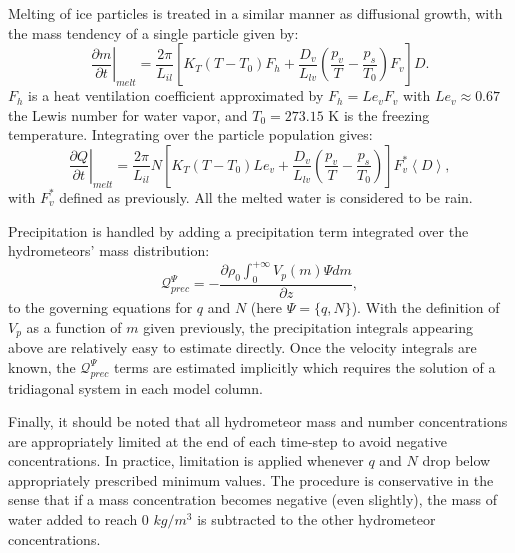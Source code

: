 \documentclass[12pt,A4,french]{article}
\begin{document}
\begin{description}
Melting of ice particles is treated in a similar manner as diffusional growth, with the mass tendency of a single particle given by:
\begin{equation}
\left.\frac{\partial m}{\partial t}\right|_{melt} = \frac{2\pi}{L_{il}} \left[K_{T}\left(T-T_{0}\right)F_{h} + \frac{D_{v}}{L_{lv}}\left(\frac{p_{v}}{T} -
\frac{p_{s}}{T_{0}}\right) F_{v}\right] D.
\end{equation}
$F_{h}$ is a heat ventilation coefficient approximated by $F_{h} = Le_{v} F_{v}$ with $Le_{v} \approx 0.67$ the Lewis number for water vapor, and $T_{0}=273.15$ K is the freezing temperature. Integrating over the particle population gives:
\begin{equation}
\left.\frac{\partial Q}{\partial t}\right|_{melt} = \frac{2\pi}{L_{il}} N \left[K_{T}\left(T-T_{0}\right)Le_{v} + \frac{D_{v}}{L_{lv}}\left(\frac{p_{v}}{T} -
\frac{p_{s}}{T_{0}}\right)\right] F_{v}^{*} \left<D\right>,
\end{equation}
with $F_{v}^{*}$ defined as previously. All the melted water is considered to be rain. 

Precipitation is handled by adding a precipitation term integrated over the hydrometeors' mass distribution:
\begin{equation}
\mathcal{Q}^{\Psi}_{prec} = - \frac{\partial \rho_0 \int_0^{+\infty} V_{p}\left(m\right) \Psi dm}{\partial z},
\end{equation}
to the governing equations for $q$ and $N$ (here $\Psi = \{q,N\}$). With the definition of $V_p$ as a function of $m$ given previously, the precipitation integrals appearing above are relatively easy to estimate directly. Once the velocity integrals are known, the $\mathcal{Q}^{\Psi}_{prec}$ terms are estimated implicitly which requires the solution of a tridiagonal system in each model column.

Finally, it should be noted that all hydrometeor mass and number concentrations are appropriately limited at the end of each time-step to avoid negative concentrations. In practice, limitation is applied whenever $q$ and $N$ drop below appropriately prescribed minimum values. The procedure is conservative in the sense that if a mass concentration becomes negative (even slightly), the mass of water added to reach $0$ $kg/m^3$ is subtracted to the other hydrometeor concentrations.


\end{description}
\end{document}
